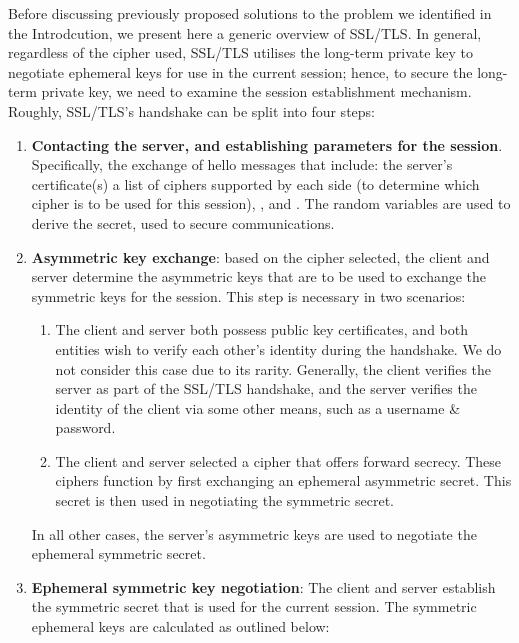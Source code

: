 \documentclass[../main.tex]{subfiles}
\begin{document}
\label{sec:ssloverview}
Before discussing previously proposed solutions to the problem we
identified in the Introdcution, we present here a generic overview of
SSL/TLS. In general, regardless of the cipher used, SSL/TLS utilises the
long-term private key to negotiate ephemeral keys for use in the
current session; hence, to secure the long-term private key, we need
to examine the session establishment mechanism. Roughly, SSL/TLS's
handshake can be split into four steps:

\begin{enumerate}
  \item \textbf{Contacting the server, and establishing parameters for
    the session}. Specifically, the exchange of hello messages that
    include: the server's certificate(s) a list of ciphers supported by
    each side (to determine which cipher is to be used for this session),
    \srandom, and \crandom. The random variables are used to derive the
    secret, used to secure communications.
  \item \textbf{Asymmetric key exchange}: based on the cipher
    selected, the client and server determine the asymmetric keys that are
    to be used to exchange the symmetric keys for the session. This step
    is necessary in two scenarios:
    \begin{enumerate}
      \item The client and server both possess public key
        certificates, and both entities wish to verify each other's identity
        during the handshake. We do not consider this case due to its
        rarity. Generally, the client verifies the server as part of the
        SSL/TLS handshake, and the server verifies the identity of the client
        via some other means, such as a username \& password.
      \item The client and server selected a cipher that offers
        forward secrecy. These ciphers function by first exchanging an
        ephemeral asymmetric secret. This secret is then used in negotiating
        the symmetric secret.
    \end{enumerate} In all other cases, the server's asymmetric keys
    are used to negotiate the ephemeral symmetric secret.
  \item \textbf{Ephemeral symmetric key negotiation}: The client and
    server establish the symmetric secret that is used for the current
    session. The symmetric ephemeral keys are calculated as outlined below:


\end{enumerate}
\end{document}
